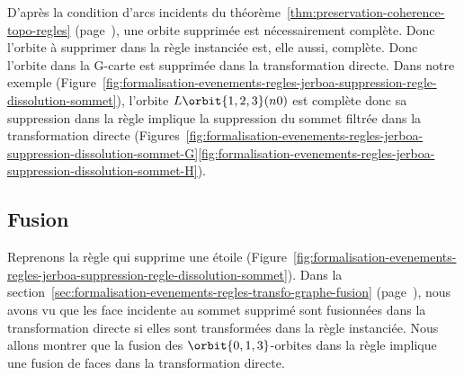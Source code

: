 D'après la condition d'arcs incidents du
théorème~\ref{thm:preservation-coherence-topo-regles}
(page~\pageref{thm:preservation-coherence-topo-regles}), une orbite supprimée
est nécessairement complète. %
Donc l'orbite à supprimer dans la règle instanciée est, elle aussi, complète. %
Donc l'orbite dans la G-carte est supprimée dans la transformation directe. %
Dans notre exemple
(Figure~\ref{fig:formalisation-evenements-regles-jerboa-suppression-regle-dissolution-sommet}),
l'orbite \(L\orbit{1,2,3}(n0)\) est complète donc sa suppression dans la règle
implique la suppression du sommet filtrée dans la transformation directe
(Figures~\ref{fig:formalisation-evenements-regles-jerboa-suppression-dissolution-sommet-G}\ref{fig:formalisation-evenements-regles-jerboa-suppression-dissolution-sommet-H}). %

\subsection{Fusion}

Reprenons la règle qui supprime une étoile
(Figure~\ref{fig:formalisation-evenements-regles-jerboa-suppression-regle-dissolution-sommet}). %
Dans la section~\ref{sec:formalisation-evenements-regles-transfo-graphe-fusion}
(page~\pageref{sec:formalisation-evenements-regles-transfo-graphe-fusion}), nous
avons vu que les face incidente au sommet supprimé sont fusionnées dans la
transformation directe si elles sont transformées dans la règle instanciée. %
Nous allons montrer que la fusion des \(\orbit{0,1,3}\)-orbites dans la règle
implique une fusion de faces dans la transformation directe. %

